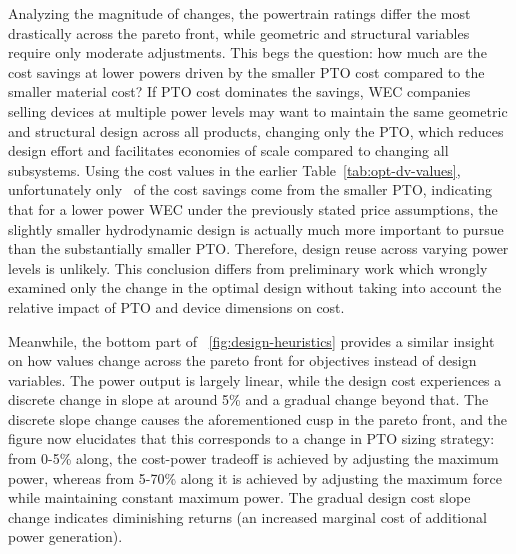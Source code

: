 Analyzing the magnitude of changes, the powertrain ratings differ the most drastically across the pareto front, while geometric and structural variables require only moderate adjustments.
This begs the question: how much are the cost savings at lower powers driven by the smaller PTO cost compared to the smaller material cost?
If PTO cost dominates the savings, WEC companies selling devices at multiple power levels may want to maintain the same geometric and structural design across all products, changing only the PTO, which reduces design effort and facilitates economies of scale compared to changing all subsystems.
Using the cost values in the earlier Table~\ref{tab:opt-dv-values}, unfortunately only \pctCostSavingsFromPTO~of the cost savings come from the smaller PTO, indicating that for a lower power WEC under the previously stated price assumptions, the slightly smaller hydrodynamic design is actually much more important to pursue than the substantially smaller PTO.
Therefore, design reuse across varying power levels is unlikely.
This conclusion differs from preliminary work \cite{mccabe_multidisciplinary_2022} which wrongly examined only the change in the optimal design without taking into account the relative impact of PTO and device dimensions on cost.

Meanwhile, the bottom part of \figureautorefname~\ref{fig:design-heuristics} provides a similar insight on how values change across the pareto front for objectives instead of design variables. %
The power output is largely linear, while the design cost experiences a discrete change in slope at around 5\% and a gradual change beyond that.
The discrete slope change causes the aforementioned cusp in the pareto front, and the figure now elucidates that this corresponds to a change in PTO sizing strategy: from 0-5\% along, the cost-power tradeoff is achieved by adjusting the maximum power, whereas from 5-70\% along it is achieved by adjusting the maximum force while maintaining constant maximum power.
The gradual design cost slope change indicates diminishing returns (an increased marginal cost of additional power generation).



